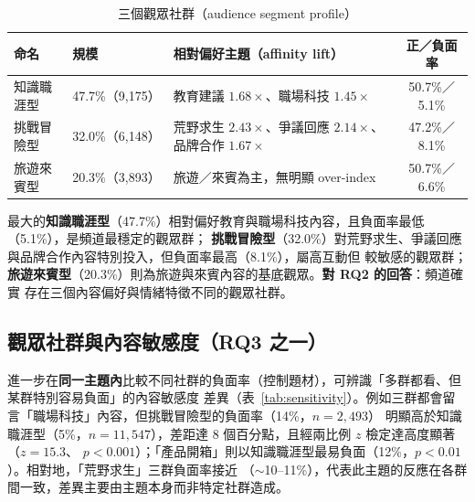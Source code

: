 \begin{table}[H]
\centering
\caption{三個觀眾社群（audience segment profile）}
\label{tab:personas}
\small
\begin{tabularx}{\linewidth}{l l Y c}
\toprule
\textbf{命名} & \textbf{規模} & \textbf{相對偏好主題（affinity lift）} & \textbf{正／負面率}\\
\midrule
知識職涯型 & 47.7\%（9{,}175） & 教育建議 $1.68\times$、職場科技 $1.45\times$ & 50.7\%／5.1\% \\
挑戰冒險型 & 32.0\%（6{,}148） & 荒野求生 $2.43\times$、爭議回應 $2.14\times$、品牌合作 $1.67\times$ & 47.2\%／8.1\% \\
旅遊來賓型 & 20.3\%（3{,}893） & 旅遊／來賓為主，無明顯 over-index & 50.7\%／6.6\% \\
\bottomrule
\end{tabularx}
\end{table}

最大的\textbf{知識職涯型}（47.7\%）相對偏好教育與職場科技內容，且負面率最低（5.1\%），是頻道最穩定的觀眾群；
\textbf{挑戰冒險型}（32.0\%）對荒野求生、爭議回應與品牌合作內容特別投入，但負面率最高（8.1\%），屬高互動但
較敏感的觀眾群；\textbf{旅遊來賓型}（20.3\%）則為旅遊與來賓內容的基底觀眾。\textbf{對 RQ2 的回答}：頻道確實
存在三個內容偏好與情緒特徵不同的觀眾社群。

\subsection{觀眾社群與內容敏感度（RQ3 之一）}
\label{sec:case-sensitivity}

進一步在\textbf{同一主題內}比較不同社群的負面率（控制題材），可辨識「多群都看、但某群特別容易負面」的內容敏感度
差異（表~\ref{tab:sensitivity}）。例如三群都會留言「職場科技」內容，但挑戰冒險型的負面率（14\%，$n{=}2{,}493$）
明顯高於知識職涯型（5\%，$n{=}11{,}547$），差距達 8 個百分點，且經兩比例 $z$ 檢定達高度顯著（$z{=}15.3$、
$p<0.001$）；「產品開箱」則以知識職涯型最易負面（12\%，$p<0.01$）。相對地，「荒野求生」三群負面率接近
（$\sim$10--11\%），代表此主題的反應在各群間一致，差異主要由主題本身而非特定社群造成。

